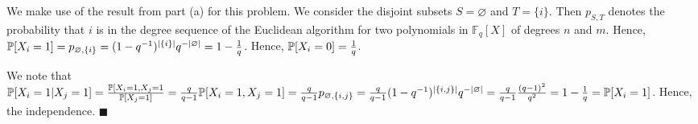 We make use of the result from part (a) for this problem. We consider the disjoint subsets $S=\varnothing$ and $T=\{i\}$. Then $p_{S,T}$ denotes the probability that $i$ is in the degree sequence of the Euclidean algorithm for two polynomials in $\mathbb{F}_q[X]$ of degrees $n$ and $m$. Hence, $\P[X_i = 1] = p_{\varnothing, \{i\}} = (1-q^{-1})^{|\{i\}|} q^{-|\varnothing|} = 1-\frac{1}{q}$. Hence, $\P[X_i = 0] = \frac{1}{q}$. 

We note that $\P[X_i = 1 | X_j = 1] = \frac{\P[X_i = 1, X_j = 1}{\P[X_j = 1]} = \frac{q}{q-1}\P[X_i=1,X_j=1] = \frac{q}{q-1}p_{\varnothing, \{i,j\}} = \frac{q}{q-1} (1-q^{-1})^{|\{i,j\}|}q^{-|\varnothing|} = \frac{q}{q-1}\frac{(q-1)^2}{q^2}=1-\frac{1}{q}=\P[X_i = 1]$. Hence, the independence. \hfill $\blacksquare$

